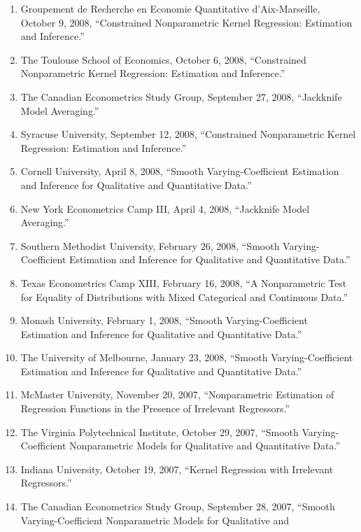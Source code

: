 \documentclass[
]{article}
\begin{document}
\begin{enumerate}
  Louisiana State University, November 14, 2008, ``Constrained
  Nonparametric Kernel Regression: Estimation and Inference.''
\item
  Groupement de Recherche en Economie Quantitative d'Aix-Marseille,
  October 9, 2008, ``Constrained Nonparametric Kernel Regression:
  Estimation and Inference.''
\item
  The Toulouse School of Economics, October 6, 2008, ``Constrained
  Nonparametric Kernel Regression: Estimation and Inference.''
\item
  The Canadian Econometrics Study Group, September 27, 2008, ``Jackknife
  Model Averaging.''
\item
  Syracuse University, September 12, 2008, ``Constrained Nonparametric
  Kernel Regression: Estimation and Inference.''
\item
  Cornell University, April 8, 2008, ``Smooth Varying-Coefficient
  Estimation and Inference for Qualitative and Quantitative Data.''
\item
  New York Econometrics Camp III, April 4, 2008, ``Jackknife Model
  Averaging.''
\item
  Southern Methodist University, February 26, 2008, ``Smooth
  Varying-Coefficient Estimation and Inference for Qualitative and
  Quantitative Data.''
\item
  Texas Econometrics Camp XIII, February 16, 2008, ``A Nonparametric
  Test for Equality of Distributions with Mixed Categorical and
  Continuous Data.''
\item
  Monash University, February 1, 2008, ``Smooth Varying-Coefficient
  Estimation and Inference for Qualitative and Quantitative Data.''
\item
  The University of Melbourne, January 23, 2008, ``Smooth
  Varying-Coefficient Estimation and Inference for Qualitative and
  Quantitative Data.''
\item
  McMaster University, November 20, 2007, ``Nonparametric Estimation of
  Regression Functions in the Presence of Irrelevant Regressors.''
\item
  The Virginia Polytechnical Institute, October 29, 2007, ``Smooth
  Varying-Coefficient Nonparametric Models for Qualitative and
  Quantitative Data.''
\item
  Indiana University, October 19, 2007, ``Kernel Regression with
  Irrelevant Regressors.''
\item
  The Canadian Econometrics Study Group, September 28, 2007, ``Smooth
  Varying-Coefficient Nonparametric Models for Qualitative and

\end{enumerate}
\end{document}
